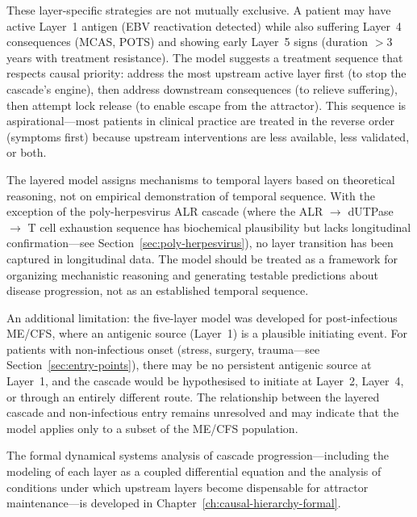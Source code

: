 These layer-specific strategies are not mutually exclusive. A patient may have active Layer~1 antigen (EBV reactivation detected) while also suffering Layer~4 consequences (MCAS, POTS) and showing early Layer~5 signs (duration $>$3 years with treatment resistance). The model suggests a treatment sequence that respects causal priority: address the most upstream active layer first (to stop the cascade's engine), then address downstream consequences (to relieve suffering), then attempt lock release (to enable escape from the attractor). This sequence is aspirational---most patients in clinical practice are treated in the reverse order (symptoms first) because upstream interventions are less available, less validated, or both.

\begin{limitation}
The layered model assigns mechanisms to temporal layers based on theoretical reasoning, not on empirical demonstration of temporal sequence. With the exception of the poly-herpesvirus ALR cascade (where the ALR $\rightarrow$ dUTPase $\rightarrow$ T cell exhaustion sequence has biochemical plausibility but lacks longitudinal confirmation---see Section~\ref{sec:poly-herpesvirus}), no layer transition has been captured in longitudinal data. The model should be treated as a framework for organizing mechanistic reasoning and generating testable predictions about disease progression, not as an established temporal sequence.

An additional limitation: the five-layer model was developed for post-infectious ME/CFS, where an antigenic source (Layer~1) is a plausible initiating event. For patients with non-infectious onset (stress, surgery, trauma---see Section~\ref{sec:entry-points}), there may be no persistent antigenic source at Layer~1, and the cascade would be hypothesised to initiate at Layer~2, Layer~4, or through an entirely different route. The relationship between the layered cascade and non-infectious entry remains unresolved and may indicate that the model applies only to a subset of the ME/CFS population.
\end{limitation}

The formal dynamical systems analysis of cascade progression---including the modeling of each layer as a coupled differential equation and the analysis of conditions under which upstream layers become dispensable for attractor maintenance---is developed in Chapter~\ref{ch:causal-hierarchy-formal}.




